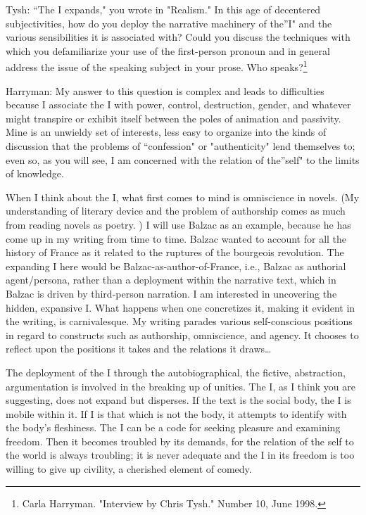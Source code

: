 \documentclass[
]{memoir}
\begin{document}
Tysh: ``The I expands," you wrote in "Realism." In this age of
decentered subjectivities, how do you deploy the narrative machinery of
the''I" and the various sensibilities it is associated with? Could you
discuss the techniques with which you defamiliarize your use of the
first-person pronoun and in general address the issue of the speaking
subject in your prose. Who speaks?\footnote{Carla Harryman. "Interview
  by Chris Tysh." Number 10, June 1998.}

Harryman: My answer to this question is complex and leads to
difficulties because I associate the I with power, control, destruction,
gender, and whatever might transpire or exhibit itself between the poles
of animation and passivity. Mine is an unwieldy set of interests, less
easy to organize into the kinds of discussion that the problems of
``confession" or "authenticity" lend themselves to; even so, as you will
see, I am concerned with the relation of the''self" to the limits of
knowledge.

When I think about the I, what first comes to mind is omniscience in
novels. (My understanding of literary device and the problem of
authorship comes as much from reading novels as poetry. ) I will use
Balzac as an example, because he has come up in my writing from time to
time. Balzac wanted to account for all the history of France as it
related to the ruptures of the bourgeois revolution. The expanding I
here would be Balzac-as-author-of-France, i.e., Balzac as authorial
agent/persona, rather than a deployment within the narrative text, which
in Balzac is driven by third-person narration. I am interested in
uncovering the hidden, expansive I. What happens when one concretizes
it, making it evident in the writing, is carnivalesque. My writing
parades various self-conscious positions in regard to constructs such as
authorship, omniscience, and agency. It chooses to reflect upon the
positions it takes and the relations it draws\ldots{}

The deployment of the I through the autobiographical, the fictive,
abstraction, argumentation is involved in the breaking up of unities.
The I, as I think you are suggesting, does not expand but disperses. If
the text is the social body, the I is mobile within it. If I is that
which is not the body, it attempts to identify with the body's
fleshiness. The I can be a code for seeking pleasure and examining
freedom. Then it becomes troubled by its demands, for the relation of
the self to the world is always troubling; it is never adequate and the
I in its freedom is too willing to give up civility, a cherished element
of comedy.
\end{document}
